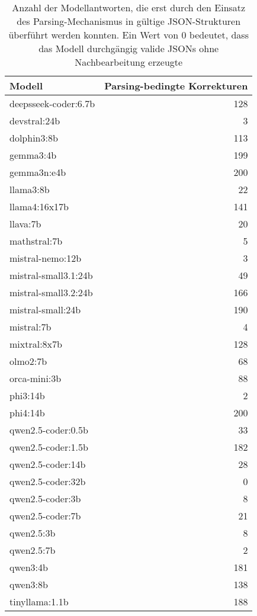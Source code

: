 \begin{table}[H]
    \centering
    \begin{tabular}{l r}
        \toprule
        \textbf{Modell} & \textbf{Parsing-bedingte Korrekturen} \\
        \midrule
        deepsseek-coder:6.7b   & 128 \\
        devstral:24b           & 3 \\
        dolphin3:8b            & 113 \\
        gemma3:4b              & 199 \\
        gemma3n:e4b            & 200 \\
        llama3:8b              & 22 \\
        llama4:16x17b          & 141 \\
        llava:7b               & 20 \\
        mathstral:7b           & 5 \\
        mistral-nemo:12b       & 3 \\
        mistral-small3.1:24b   & 49 \\
        mistral-small3.2:24b   & 166 \\
        mistral-small:24b      & 190 \\
        mistral:7b             & 4 \\
        mixtral:8x7b           & 128 \\
        olmo2:7b               & 68 \\
        orca-mini:3b           & 88 \\
        phi3:14b               & 2 \\
        phi4:14b               & 200 \\
        qwen2.5-coder:0.5b     & 33 \\
        qwen2.5-coder:1.5b     & 182 \\
        qwen2.5-coder:14b      & 28 \\
        qwen2.5-coder:32b      & 0 \\
        qwen2.5-coder:3b       & 8 \\
        qwen2.5-coder:7b       & 21 \\
        qwen2.5:3b             & 8 \\
        qwen2.5:7b             & 2 \\
        qwen3:4b               & 181 \\
        qwen3:8b               & 138 \\
        tinyllama:1.1b         & 188 \\
        \bottomrule
    \end{tabular}
    \caption{Anzahl der Modellantworten, die erst durch den Einsatz des Parsing-Mechanismus in gültige JSON-Strukturen überführt werden konnten. Ein Wert von \num{0} bedeutet, dass das Modell durchgängig valide JSONs ohne Nachbearbeitung erzeugte}
    \label{tab:extraction-beneficial}
\end{table}

